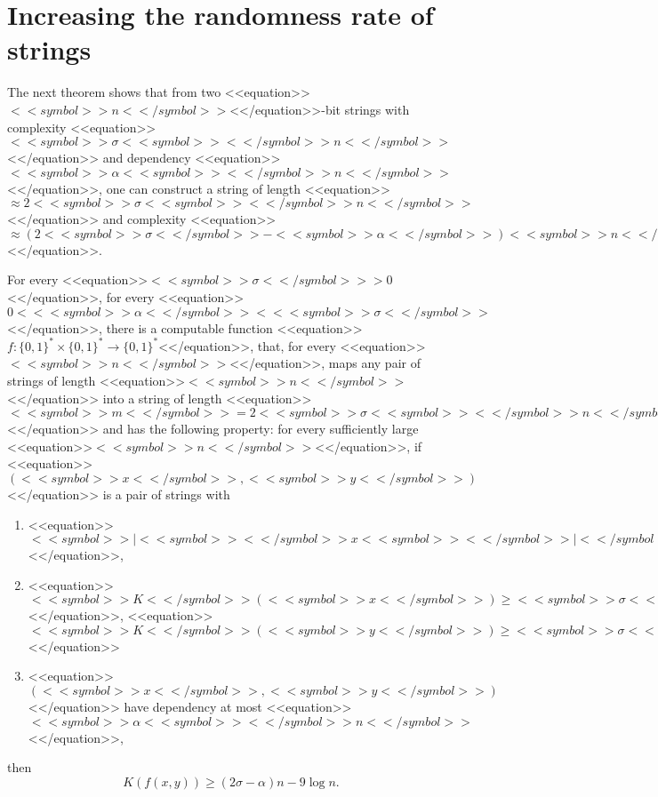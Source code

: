 \documentclass[proceedings]{stacs}
\def\zo{\{0,1\}}
\def\mapping{\rightarrow}
\begin{document}
\section{Increasing the randomness rate of strings}
The next theorem shows that from two <<equation>>$<<symbol>>n<</symbol>>$<</equation>>-bit strings with complexity <<equation>>$<<symbol>>\sigma <<symbol>><</symbol>>n<</symbol>>$<</equation>> and dependency <<equation>>$<<symbol>>\alpha <<symbol>><</symbol>>n<</symbol>>$<</equation>>, one can construct a string of length <<equation>>$\approx 2<<symbol>>\sigma <<symbol>><</symbol>>n<</symbol>>$<</equation>> and complexity <<equation>>$\approx ( 2<<symbol>>\sigma <</symbol>>- <<symbol>>\alpha<</symbol>>)<<symbol>>n<</symbol>>$<</equation>>.
\begin{theorem}
\label{t:result2}
For every <<equation>>$<<symbol>>\sigma <</symbol>>> 0$<</equation>>, for every <<equation>>$0 < <<symbol>>\alpha <</symbol>>< <<symbol>>\sigma<</symbol>>$<</equation>>, there is a computable function
<<equation>>$f:\zo^* \times \zo^* \mapping \zo^*$<</equation>>, that, for every <<equation>>$<<symbol>>n<</symbol>>$<</equation>>,  maps any pair of strings of length <<equation>>$<<symbol>>n<</symbol>>$<</equation>> into a string of length <<equation>>$<<symbol>>m<</symbol>> = 2<<symbol>>\sigma <<symbol>><</symbol>>n<</symbol>> - \log <<symbol>>n<</symbol>>$<</equation>>  and has the following property: for every sufficiently large <<equation>>$<<symbol>>n<</symbol>>$<</equation>>,
if <<equation>>$(<<symbol>>x<</symbol>>,<<symbol>>y<</symbol>>)$<</equation>> is a pair of strings with
\begin{enumerate}
	\item <<equation>>$<<symbol>>|<<symbol>><</symbol>>x<<symbol>><</symbol>>|<</symbol>> = <<symbol>>|<<symbol>><</symbol>>y<<symbol>><</symbol>>|<</symbol>> = <<symbol>>n<</symbol>>$<</equation>>,
	\item <<equation>>$<<symbol>>K<</symbol>>(<<symbol>>x<</symbol>>) \geq <<symbol>>\sigma <<symbol>><</symbol>>n<</symbol>>$<</equation>>, <<equation>>$<<symbol>>K<</symbol>>(<<symbol>>y<</symbol>>) \geq <<symbol>>\sigma <<symbol>><</symbol>>n<</symbol>>$<</equation>>
	\item <<equation>>$(<<symbol>>x<</symbol>>,<<symbol>>y<</symbol>>)$<</equation>> have dependency at most <<equation>>$<<symbol>>\alpha <<symbol>><</symbol>>n<</symbol>>$<</equation>>,
\end{enumerate}
then
\[
K(f(x,y)) \geq (2\sigma - \alpha) n - 9 \log n.
\]
\end{theorem}
\end{document}
